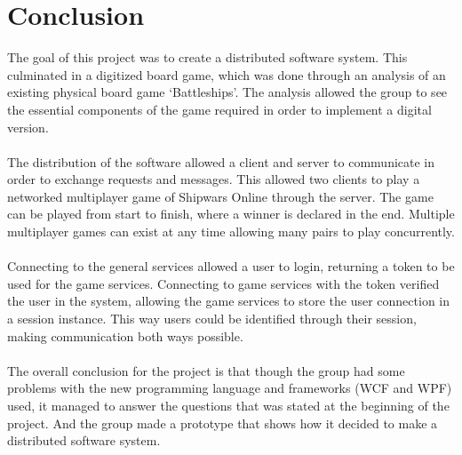 
\chapter{Conclusion}
The goal of this project was to create a distributed software system.
This culminated in a digitized board game, which was done through an analysis
of an existing physical board game ‘Battleships’. The analysis allowed the
 group to see the essential components of the game required in order to
 implement a digital version.
\\
\\
The distribution of the software allowed a client and server to communicate
in order to exchange requests and messages. This allowed two clients to play
 a networked multiplayer game of Shipwars Online through the server. The game
  can be played from start to finish, where a winner is declared in the end.
   Multiple multiplayer games can exist at any time allowing many pairs to
   play concurrently.
\\
\\
Connecting to the general services allowed a user to login, returning a token
to be used for the game services. Connecting to game services with the token
 verified the user in the system, allowing the game services to store the user
  connection in a session instance. This way users could be identified through
  their session, making communication both ways possible.
\\
\\
The overall conclusion for the project is that though the group had some
 problems with the new programming language and frameworks (WCF and WPF)
  used, it managed to answer the questions that was stated at the beginning
   of the project. And the group made a prototype that shows how it decided
    to make a distributed software system.
